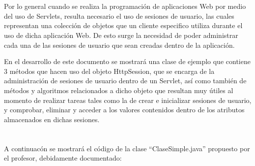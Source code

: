 \documentclass[10pt,a4paper]{article} %
\begin{document}
\section{}%
{\large Por lo general cuando se realiza la programaci{\' o}n de aplicaciones Web por medio del uso de Servlets, resulta necesario el uso de sesiones de usuario, las cuales representan una colecci{\' o}n de objetos que un cliente especifico utiliza durante el uso de dicha aplicaci{\' o}n Web. De esto surge la necesidad de poder administrar cada una de las sesiones de usuario que sean creadas dentro de la aplicaci{\' o}n.


\vspace{0.5cm}
En el desarrollo de este documento se mostrar{\' a} una clase de ejemplo que contiene 3 m{\' e}todos que hacen uso del objeto HttpSession, que se encarga de la administraci{\' o}n de sesiones de usuario dentro de un Servlet, as{\' i} como tambi{\' e}n de m{\' e}todos y algoritmos relacionados a dicho objeto que resultan muy {\' u}tiles al momento de realizar tareas tales como la de crear e inicializar sesiones de usuario, y comprobar, eliminar y acceder a los valores contenidos dentro de los atributos almacenados en dichas sesiones.}


\pagebreak

\section{\color{colorIPN}{Desarrollo}}
{\large A continuac{\'o}n se mostrar{\'a} el c{\' o}digo de la clase ``ClaseSimple.java'' propuesto por el profesor, debidamente documentado:
\vspace{0.5cm}}
\end{document}

